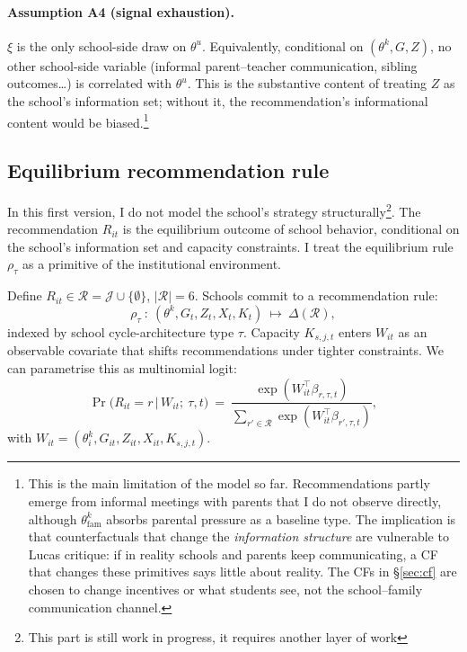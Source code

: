 \documentclass{article}
\begin{document}
\paragraph{Assumption A4 (signal exhaustion).} $\xi$ is the only school-side draw on $\theta^u$. Equivalently, conditional on $(\theta^k, G, Z)$, no other school-side variable (informal parent--teacher communication, sibling outcomes\dots) is correlated with $\theta^u$. This is the substantive content of treating $Z$ as the school's information set; without it, the recommendation's informational content would be biased.\footnote{This is the main limitation of the model so far. Recommendations partly emerge from informal meetings with parents that I do not observe directly, although $\theta^k_{\mathrm{fam}}$ absorbs parental pressure as a baseline type. The implication is that counterfactuals that change the \emph{information structure} are vulnerable to Lucas critique: if in reality schools and parents keep communicating, a CF that changes these primitives says little about reality. The CFs in \S\ref{sec:cf} are chosen to change incentives or what students see, not the school--family communication channel.}

\subsection{Equilibrium recommendation rule}

In this first version, I do not model the school's strategy structurally\footnote{This part is still work in progress, it requires another layer of work}. The recommendation $R_{it}$ is the equilibrium outcome of school behavior, conditional on the school's information set and capacity constraints. I treat the equilibrium rule $\rho_\tau$ as a primitive of the institutional environment.

Define $R_{it} \in \mathcal{R} = \mathcal{J} \cup \{\emptyset\}$, $|\mathcal{R}| = 6$. Schools commit to a recommendation rule:
\begin{equation}
  \rho_{\tau} \ :\ (\theta^k, G_t, Z_t, X_t, K_t) \ \longmapsto\ \Delta(\mathcal{R}),
  \label{eq:rho_def}
\end{equation}
indexed by school cycle-architecture type $\tau$. Capacity $K_{s,j,t}$ enters $W_{it}$ as an observable covariate that shifts recommendations under tighter constraints. We can parametrise this as multinomial logit:
\begin{equation}
  \Pr\!\big(R_{it} = r \,\big|\, W_{it};\ \tau,t\big)
  \ =\ \frac{\exp(W_{it}^\top \beta_{r,\tau,t})}{\sum_{r' \in \mathcal{R}} \exp(W_{it}^\top \beta_{r',\tau,t})},
  \label{eq:rho_mnl}
\end{equation}
with $W_{it} = (\theta^k_i, G_{it}, Z_{it}, X_{it}, K_{s,j,t})$.
\end{document}
